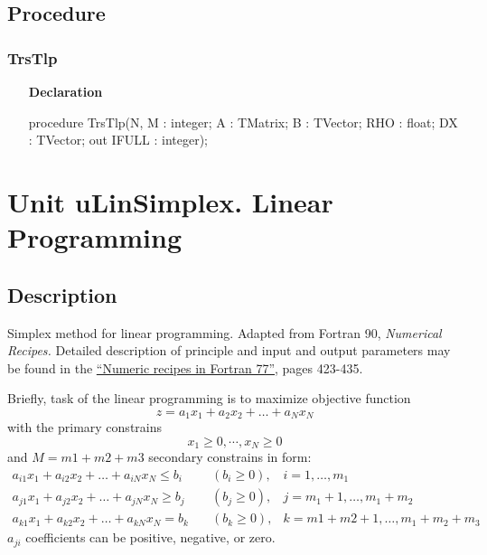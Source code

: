 \documentclass[12pt,a4paper,oneside]{report}
\newcommand{\lmatha}[1]{   %
	\marginpar{\vspace{#1} 
		\begin{flushright}
			LMath 0.5
	\end{flushright} }
}
\newcommand{\declarationitem}[1]{\textbf{#1}}
\begin{document}
\subsection{Procedure}
\subsubsection{TrsTlp}
\label{utrstlp:trstlp}
\begin{itemize}
	\item[\declarationitem{Declaration}\hfill]
	\begin{flushleft}
procedure TrsTlp(N, M : integer; A : TMatrix; B : TVector; RHO : float; DX : TVector; out IFULL : integer);
	\end{flushleft}
\end{itemize}

\section[Unit uLinSimplex]{Unit uLinSimplex. Linear Programming}
\label{sec:unit-ulinsimplex}
\lmatha{-24pt}
\subsection{Description}
Simplex method for linear programming.  
Adapted from Fortran 90, \textit{Numerical Recipes.}
Detailed description of principle and input and output parameters may be found in the 
\href{https://websites.pmc.ucsc.edu/~fnimmo/eart290c_17/NumericalRecipesinF77.pdf}{``Numeric recipes in Fortran 77''}, pages 423-435.

Briefly, task of the linear programming is to maximize objective function
\begin{equation}\label{eq:linprogobjective}
z=a_1x_1+a_2x_2+\dots+a_Nx_N
\end{equation}
with the primary constrains $$x_1 \geq 0,\cdots,x_N \geq 0$$
and $M = m1+m2+m3$ secondary constrains in form:
\begin{align}
a_{i1}x_1+a_{i2}x_2+\dots+a_{iN}x_N \leq b_i & \quad (b_i \geq 0), &i=1,\dots,m_1 \label{eq:linprogm1}\\
a_{j1}x_1+a_{j2}x_2+\dots+a_{jN}x_N \geq b_j & \quad (b_j \geq 0), &j=m_1+1,\dots,m_1+m_2 \label{eq:linprogm2}\\
a_{k1}x_1+a_{k2}x_2+\dots+a_{kN}x_N = b_k & \quad (b_k \geq 0), &k=m1+m2+1,\dots,m_1+m_2+m_3 \label{eq:linprogm3}
\end{align}
$a_{ji}$ coefficients can be positive, negative, or zero.
\end{document}

